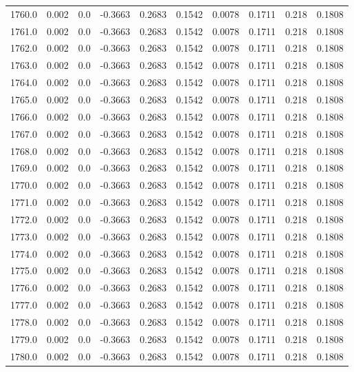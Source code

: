 \begin{longtable}{lrrrrrrrrr}
1760.0 & 0.002 & 0.0 & -0.3663 & 0.2683 & 0.1542 & 0.0078 & 0.1711 & 0.218 & 0.1808 \\
1761.0 & 0.002 & 0.0 & -0.3663 & 0.2683 & 0.1542 & 0.0078 & 0.1711 & 0.218 & 0.1808 \\
1762.0 & 0.002 & 0.0 & -0.3663 & 0.2683 & 0.1542 & 0.0078 & 0.1711 & 0.218 & 0.1808 \\
1763.0 & 0.002 & 0.0 & -0.3663 & 0.2683 & 0.1542 & 0.0078 & 0.1711 & 0.218 & 0.1808 \\
1764.0 & 0.002 & 0.0 & -0.3663 & 0.2683 & 0.1542 & 0.0078 & 0.1711 & 0.218 & 0.1808 \\
1765.0 & 0.002 & 0.0 & -0.3663 & 0.2683 & 0.1542 & 0.0078 & 0.1711 & 0.218 & 0.1808 \\
1766.0 & 0.002 & 0.0 & -0.3663 & 0.2683 & 0.1542 & 0.0078 & 0.1711 & 0.218 & 0.1808 \\
1767.0 & 0.002 & 0.0 & -0.3663 & 0.2683 & 0.1542 & 0.0078 & 0.1711 & 0.218 & 0.1808 \\
1768.0 & 0.002 & 0.0 & -0.3663 & 0.2683 & 0.1542 & 0.0078 & 0.1711 & 0.218 & 0.1808 \\
1769.0 & 0.002 & 0.0 & -0.3663 & 0.2683 & 0.1542 & 0.0078 & 0.1711 & 0.218 & 0.1808 \\
1770.0 & 0.002 & 0.0 & -0.3663 & 0.2683 & 0.1542 & 0.0078 & 0.1711 & 0.218 & 0.1808 \\
1771.0 & 0.002 & 0.0 & -0.3663 & 0.2683 & 0.1542 & 0.0078 & 0.1711 & 0.218 & 0.1808 \\
1772.0 & 0.002 & 0.0 & -0.3663 & 0.2683 & 0.1542 & 0.0078 & 0.1711 & 0.218 & 0.1808 \\
1773.0 & 0.002 & 0.0 & -0.3663 & 0.2683 & 0.1542 & 0.0078 & 0.1711 & 0.218 & 0.1808 \\
1774.0 & 0.002 & 0.0 & -0.3663 & 0.2683 & 0.1542 & 0.0078 & 0.1711 & 0.218 & 0.1808 \\
1775.0 & 0.002 & 0.0 & -0.3663 & 0.2683 & 0.1542 & 0.0078 & 0.1711 & 0.218 & 0.1808 \\
1776.0 & 0.002 & 0.0 & -0.3663 & 0.2683 & 0.1542 & 0.0078 & 0.1711 & 0.218 & 0.1808 \\
1777.0 & 0.002 & 0.0 & -0.3663 & 0.2683 & 0.1542 & 0.0078 & 0.1711 & 0.218 & 0.1808 \\
1778.0 & 0.002 & 0.0 & -0.3663 & 0.2683 & 0.1542 & 0.0078 & 0.1711 & 0.218 & 0.1808 \\
1779.0 & 0.002 & 0.0 & -0.3663 & 0.2683 & 0.1542 & 0.0078 & 0.1711 & 0.218 & 0.1808 \\
1780.0 & 0.002 & 0.0 & -0.3663 & 0.2683 & 0.1542 & 0.0078 & 0.1711 & 0.218 & 0.1808 \\

\end{longtable}
